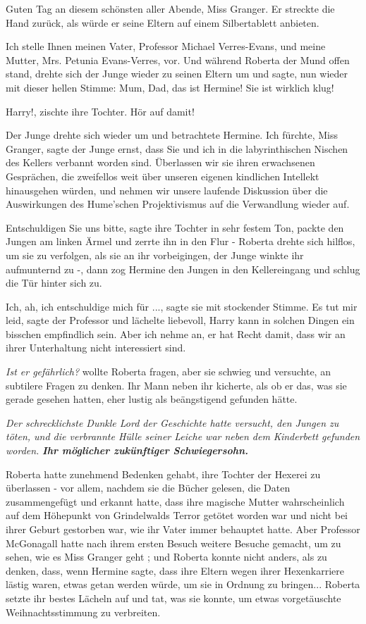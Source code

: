 \glqq{}Guten Tag an diesem schönsten aller Abende, Miss Granger.\grqq{} Er streckte die
Hand zurück, als würde er seine Eltern auf einem Silbertablett anbieten.

\glqq{}Ich stelle Ihnen meinen Vater, Professor Michael Verres-Evans, und meine
Mutter, Mrs. Petunia Evans-Verres, vor.\grqq{} Und während Roberta der Mund offen
stand, drehte sich der Junge wieder zu seinen Eltern um und sagte, nun wieder
mit dieser hellen Stimme: \glqq{}Mum, Dad, das ist Hermine! Sie ist wirklich
klug!\grqq{}

\glqq{}Harry!\grqq{}, zischte ihre Tochter. \glqq{}Hör auf damit!\grqq{}

Der Junge drehte sich wieder um und betrachtete Hermine. \glqq{}Ich fürchte, Miss
Granger\grqq{}, sagte der Junge ernst, \glqq{}dass Sie und ich in die
labyrinthischen Nischen des Kellers verbannt worden sind. Überlassen wir sie
ihren erwachsenen Gesprächen, die zweifellos weit über unseren eigenen
kindlichen Intellekt hinausgehen würden, und nehmen wir unsere laufende
Diskussion über die Auswirkungen des Hume'schen Projektivismus auf die
Verwandlung wieder auf.\grqq{}

\glqq{}Entschuldigen Sie uns bitte\grqq{}, sagte ihre Tochter in sehr festem Ton,
packte den Jungen am linken Ärmel und zerrte ihn in den Flur - Roberta drehte
sich hilflos, um sie zu verfolgen, als sie an ihr vorbeigingen, der Junge winkte
ihr aufmunternd zu -, dann zog Hermine den Jungen in den Kellereingang und
schlug die Tür hinter sich zu.

\glqq{}Ich, ah, ich entschuldige mich für ...\grqq{}, sagte sie mit stockender
Stimme. \glqq{}Es tut mir leid\grqq{}, sagte der Professor und lächelte
liebevoll, \glqq{}Harry kann in solchen Dingen ein bisschen empfindlich sein.
Aber ich nehme an, er hat Recht damit, dass wir an ihrer Unterhaltung nicht
interessiert sind.\grqq{}

\emph{Ist er gefährlich?} wollte Roberta fragen, aber sie schwieg und
versuchte, an subtilere Fragen zu denken. Ihr Mann neben ihr kicherte, als ob er
das, was sie gerade gesehen hatten, eher lustig als beängstigend gefunden hätte.

\emph{Der schrecklichste Dunkle Lord der Geschichte hatte versucht, den Jungen
zu töten, und die verbrannte Hülle seiner Leiche war neben dem Kinderbett
gefunden worden.}
\textbf{\emph{ Ihr möglicher zukünftiger Schwiegersohn.} }

Roberta hatte zunehmend Bedenken gehabt, ihre Tochter der Hexerei zu überlassen
- vor allem, nachdem sie die Bücher gelesen, die Daten zusammengefügt und
erkannt hatte, dass ihre magische Mutter wahrscheinlich auf dem Höhepunkt von
Grindelwalds Terror getötet worden war und nicht bei ihrer Geburt gestorben war,
wie ihr Vater immer behauptet hatte. Aber Professor McGonagall hatte nach ihrem
ersten Besuch weitere Besuche gemacht, um \glqq{}zu sehen, wie es Miss Granger
geht\grqq{} ; und Roberta konnte nicht anders, als zu denken, dass, wenn Hermine
sagte, dass ihre Eltern wegen ihrer Hexenkarriere lästig waren, etwas getan
werden würde, um sie in Ordnung zu bringen... Roberta setzte ihr bestes Lächeln
auf und tat, was sie konnte, um etwas vorgetäuschte Weihnachtsstimmung zu
verbreiten.

